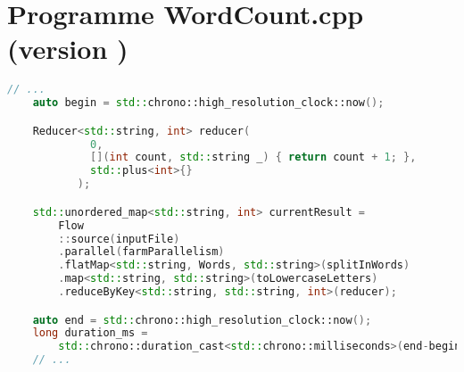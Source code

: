 \newpage
\section{Programme {WordCount.cpp} (version \ppff)}
\label{appendice-code-wordcount-ppff.ann}
\begin{lstlisting}[gobble=4,basicstyle=\ttfamily\footnotesize,language=c++]
    // ...
    auto begin = std::chrono::high_resolution_clock::now();

    Reducer<std::string, int> reducer(
             0, 
             [](int count, std::string _) { return count + 1; },
             std::plus<int>{}
           );

    std::unordered_map<std::string, int> currentResult = 
        Flow
        ::source(inputFile)
        .parallel(farmParallelism)
        .flatMap<std::string, Words, std::string>(splitInWords)			
        .map<std::string, std::string>(toLowercaseLetters)			
        .reduceByKey<std::string, std::string, int>(reducer);  

    auto end = std::chrono::high_resolution_clock::now();
    long duration_ms = 
        std::chrono::duration_cast<std::chrono::milliseconds>(end-begin).count();
    // ...
\end{lstlisting}

\newpage

